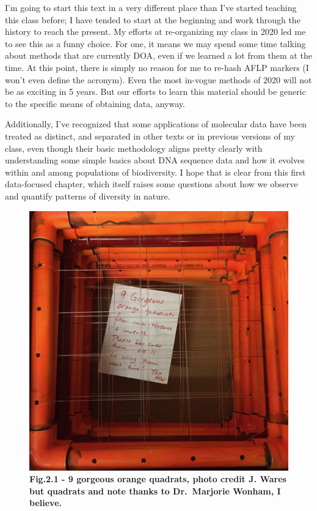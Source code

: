 \documentclass[
]{article}
\begin{document}
I'm going to start this text in a very different place than I've started
teaching this class before; I have tended to start at the beginning and
work through the history to reach the present. My efforts at
re-organizing my class in 2020 led me to see this as a funny choice. For
one, it means we may spend some time talking about methods that are
currently DOA, even if we learned a lot from them at the time. At this
point, there is simply no reason for me to re-hash AFLP markers (I won't
even define the acronym). Even the most in-vogue methods of 2020 will
not be as exciting in 5 years. But our efforts to learn this material
should be generic to the specific means of obtaining data, anyway.

Additionally, I've recognized that some applications of molecular data
have been treated as distinct, and separated in other texts or in
previous versions of my class, even though their basic methodology
aligns pretty clearly with understanding some simple basics about DNA
sequence data and how it evolves within and among populations of
biodiversity. I hope that is clear from this first data-focused chapter,
which itself raises some questions about how we observe and quantify
patterns of diversity in nature.

\begin{figure}
\centering
\includegraphics{MEImages/marsquadrats.jpg}
\caption{\textbf{Fig.2.1 - 9 gorgeous orange quadrats, photo credit J.
Wares but quadrats and note thanks to Dr.~Marjorie Wonham, I believe. }}
\end{figure}
\end{document}
